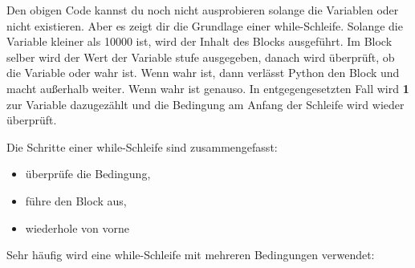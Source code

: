 Den obigen Code kannst du noch nicht ausprobieren solange die Variablen  oder  nicht existieren. Aber es zeigt dir die Grundlage einer while-Schleife. Solange die Variable  kleiner als 10000 ist, wird der Inhalt des Blocks ausgeführt. Im Block selber wird der Wert der Variable stufe ausgegeben, danach wird überprüft, ob die Variable  oder  wahr ist. Wenn  wahr ist, dann verlässt Python den Block und macht außerhalb weiter. Wenn  wahr ist genauso. In entgegengesetzten Fall wird \textbf{1} zur Variable  dazugezählt und die Bedingung am Anfang der Schleife wird wieder überprüft.
\par
\noindent
Die Schritte einer while-Schleife sind zusammengefasst:

{\renewcommand{\labelitemi}{$\triangleright$}
\begin{itemize}
\item überprüfe die Bedingung,
\item führe den Block aus,
\item wiederhole von vorne
\end{itemize}}

Sehr häufig wird eine while-Schleife mit mehreren Bedingungen verwendet:

